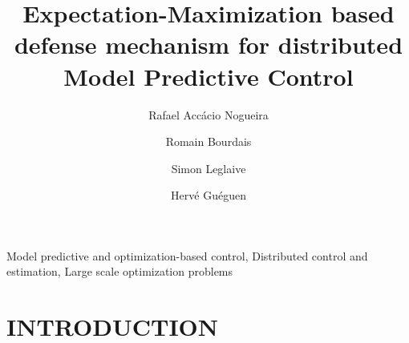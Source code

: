 \documentclass{ifacconf}  %
\begin{document}
\begin{frontmatter}
\title{\LARGE \bf
  Expectation-Maximization based defense mechanism for distributed Model Predictive Control
}

\author[First]{Rafael Accácio Nogueira}
\author[First]{Romain Bourdais}
\author[First]{Simon Leglaive}
\author[First]{Hervé Guéguen}
\address[First]{IETR-CentraleSupélec, 35510 Cesson-Sévigné, Ille-et-Vilaine, France\\
{\tt\small \{rafael-accacio.nogueira, romain.bourdais, simon.leglaive, herve.gueguen\}
@centralesupelec.fr}}




\begin{abstract}%
\end{abstract}

\begin{keyword}
  Model predictive and optimization-based control,
  Distributed control and estimation,
Large scale optimization problems
\end{keyword}

\end{frontmatter}

\section{INTRODUCTION}


\end{document}
